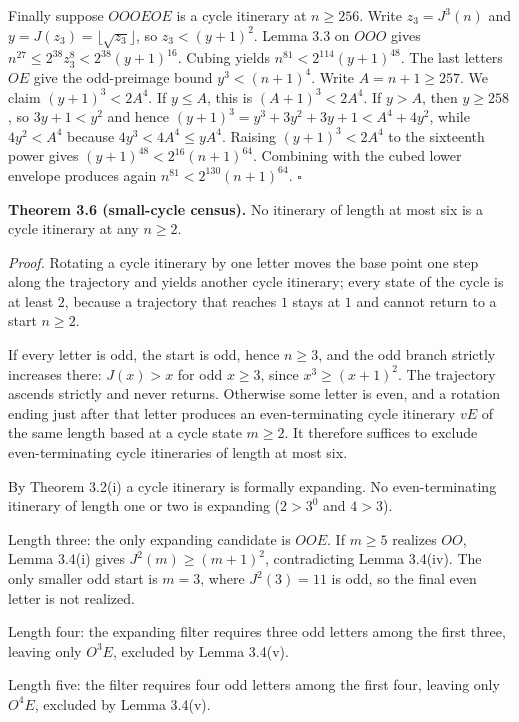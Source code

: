 \documentclass[12pt]{article}
\begin{document}
Finally suppose \(OOOEOE\) is a cycle itinerary at \(n\ge 256\). Write
\(z_3=J^3(n)\) and \(y=J(z_3)=\lfloor\sqrt{z_3}\rfloor\), so
\(z_3<(y+1)^2\). Lemma 3.3 on \(OOO\) gives
\(n^{27}\le 2^{38}z_3^8<2^{38}(y+1)^{16}\). Cubing yields
\(n^{81}<2^{114}(y+1)^{48}\). The last letters \(OE\) give the
odd-preimage bound \(y^3<(n+1)^4\). Write \(A=n+1\ge 257\). We claim
\((y+1)^3<2A^4\). If \(y\le A\), this is \((A+1)^3<2A^4\). If \(y>A\),
then \(y\ge 258\), so \(3y+1<y^2\) and hence
\((y+1)^3=y^3+3y^2+3y+1<A^4+4y^2\), while \(4y^2<A^4\) because
\(4y^3<4A^4\le yA^4\). Raising \((y+1)^3<2A^4\) to the sixteenth power
gives \((y+1)^{48}<2^{16}(n+1)^{64}\). Combining with the cubed lower
envelope produces again \(n^{81}<2^{130}(n+1)^{64}\). \(\square\)

\textbf{Theorem 3.6 (small-cycle census).} No itinerary of length at
most six is a cycle itinerary at any \(n\ge 2\).

\emph{Proof.} Rotating a cycle itinerary by one letter moves the base
point one step along the trajectory and yields another cycle itinerary;
every state of the cycle is at least \(2\), because a trajectory that
reaches \(1\) stays at \(1\) and cannot return to a start \(n\ge 2\).

If every letter is odd, the start is odd, hence \(n\ge 3\), and the odd
branch strictly increases there: \(J(x)>x\) for odd \(x\ge 3\), since
\(x^3\ge(x+1)^2\). The trajectory ascends strictly and never returns.
Otherwise some letter is even, and a rotation ending just after that
letter produces an even-terminating cycle itinerary \(vE\) of the same
length based at a cycle state \(m\ge 2\). It therefore suffices to
exclude even-terminating cycle itineraries of length at most six.

By Theorem 3.2(i) a cycle itinerary is formally expanding. No
even-terminating itinerary of length one or two is expanding (\(2>3^0\)
and \(4>3\)).

Length three: the only expanding candidate is \(OOE\). If \(m\ge 5\)
realizes \(OO\), Lemma 3.4(i) gives \(J^2(m)\ge(m+1)^2\), contradicting
Lemma 3.4(iv). The only smaller odd start is \(m=3\), where
\(J^2(3)=11\) is odd, so the final even letter is not realized.

Length four: the expanding filter requires three odd letters among the
first three, leaving only \(O^3E\), excluded by Lemma 3.4(v).

Length five: the filter requires four odd letters among the first four,
leaving only \(O^4E\), excluded by Lemma 3.4(v).
\end{document}
